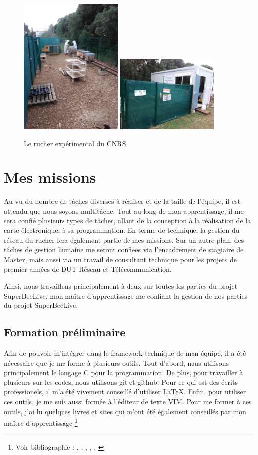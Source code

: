 \documentclass[11pt,french,a4paper]{report}
\begin{document}
\begin{figure}[!h]
    \centering 
    \includegraphics[width=5cm]{./img/photo_ext_ruche.jpg} 
    \includegraphics[width=5cm]{./img/photo_ext_prefab.jpg}
    \caption{Le rucher expérimental du CNRS}
    \label{rucher_exp}
\end{figure}


\chapter{Mes missions}
Au vu du nombre de tâches diverses à réaliser et de la taille de l'équipe, il est attendu que nous soyons multitâche. Tout 
au long de mon apprentissage, il me sera confié plusieurs types de tâches, allant de la conception à la réalisation de la 
carte électronique, à sa programmation. En terme de technique, la gestion du réseau du rucher fera également partie de mes missions.
Sur un autre plan, des tâches de gestion humaine me seront confiées via l'encadrement de stagiaire de Master, 
mais aussi via un travail de consultant technique pour les projets de premier années de DUT Réseau et Télécommunication. 

Ainsi, nous travaillons principalement à deux sur toutes les parties du projet SuperBeeLive, mon maître d'apprentissage me
confiant la gestion de nos parties du projet SuperBeeLive. 

\section{Formation préliminaire}
Afin de pouvoir m'intégrer dans le framework technique de mon équipe, il a été nécessaire
que je me forme à plusieurs outils. Tout d'abord, nous utilisons principalement le langage C pour la programmation.
De plus, pour travailler à plusieurs sur les codes, nous utilisons git et github. Pour ce qui est des écrits professionels, 
il m'a été vivement conseillé d'utiliser LaTeX. Enfin, pour utiliser ces outils, je me suis aussi formée à l'éditeur 
de texte VIM. 
Pour me former à ces outils, j'ai lu quelques livres et sites qui m'ont été également conseillés par mon maître d'apprentissage
\footnote{Voir bibliographie : \cite{ref4}, \cite{ref5}, \cite{ref6}, \cite{ref7}, \cite{ref8}, \cite{ref9}}
\end{document}
